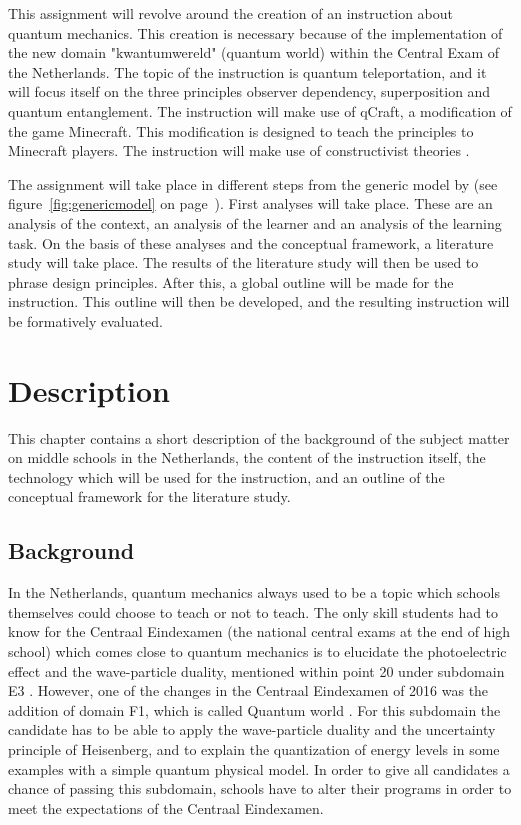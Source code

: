 \documentclass[12pt]{report} %
\begin{document}
This assignment will revolve around the creation of an instruction about quantum mechanics. This creation is necessary because of the implementation of the new domain "kwantumwereld" (quantum world) within the Central Exam of the Netherlands. The topic of the instruction is quantum teleportation, and it will focus itself on the three principles observer dependency, superposition and quantum entanglement. The instruction will make use of qCraft, a modification of the game Minecraft. This modification is designed to teach the principles to Minecraft players. The instruction will make use of constructivist theories \cite{smithragan}.

The assignment will take place in different steps from the generic model by  (see figure~\ref{fig:genericmodel} on page~\pageref{fig:genericmodel}). First analyses will take place. These are an analysis of the context, an analysis of the learner and an analysis of the learning task. On the basis of these analyses and the conceptual framework, a literature study will take place. The results of the literature study will then be used to phrase design principles. After this, a global outline will be made for the instruction. This outline will then be developed, and the resulting instruction will be formatively evaluated.

\chapter{Description}

This chapter contains a short description of the background of the subject matter on middle schools in the Netherlands, the content of the instruction itself, the technology which will be used for the instruction, and an outline of the conceptual framework for the literature study.

\section{Background}

In the Netherlands, quantum mechanics always used to be a topic which schools themselves could choose to teach or not to teach. The only skill students had to know for the Centraal Eindexamen (the national central exams at the end of high school) which comes close to quantum mechanics is to elucidate the photoelectric effect and the wave-particle duality, mentioned within point 20 under subdomain E3 \cite{eindexamen2015}. However, one of the changes in the Centraal Eindexamen of 2016 was the addition of domain F1, which is called Quantum world \cite{eindexamen2016}. For this subdomain the candidate has to be able to apply the wave-particle duality and the uncertainty principle of Heisenberg, and to explain the quantization of energy levels in some examples with a simple quantum physical model. In order to give all candidates a chance of passing this subdomain, schools have to alter their programs in order to meet the expectations of the Centraal Eindexamen.
\end{document}
